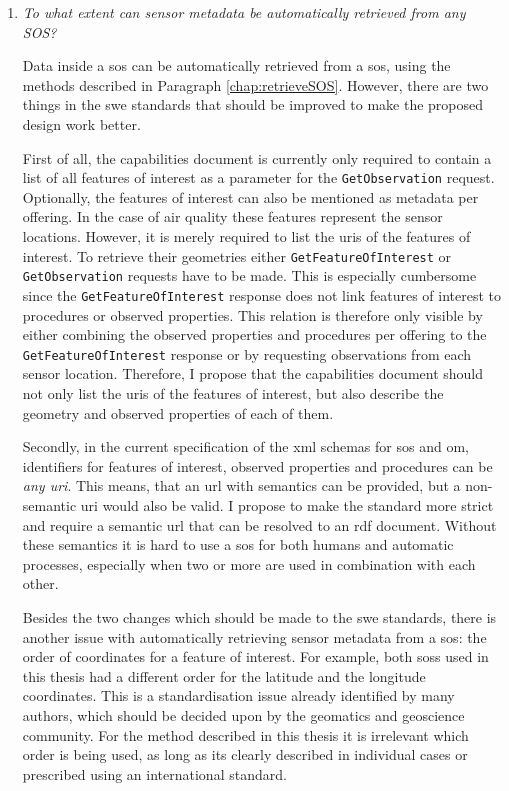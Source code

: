 \begin{enumerate}
\item \textit{To what extent can sensor metadata be automatically retrieved from any SOS?}%

Data inside a \acl{sos} can be automatically retrieved from a \ac{sos}, using the methods described in Paragraph \ref{chap:retrieveSOS}. However, there are two things in the \ac{swe} standards that should be improved to make the proposed design work better. 

\begin{sloppypar}
	First of all, the capabilities document is currently only required to contain a list of all features of interest as a parameter for the \texttt{GetObservation} request. Optionally, the features of interest can also be mentioned as metadata per offering. In the case of air quality these features represent the sensor locations. However, it is merely required to list the \acp{uri} of the features of interest. To retrieve their geometries either \texttt{GetFeatureOfInterest} or \texttt{GetObservation} requests have to be made. This is especially cumbersome since the \texttt{GetFeatureOfInterest} response does not link features of interest to procedures or observed properties. This relation is therefore only visible by either combining the observed properties and procedures per offering to the \texttt{GetFeatureOfInterest} response or by requesting observations from each sensor location. Therefore, I propose that the capabilities document should not only list the \acp{uri} of the features of interest, but also describe the geometry and observed properties of each of them. 
\end{sloppypar}

Secondly, in the current specification of the \ac{xml} schemas for \ac{sos} and \ac{om}, identifiers for features of interest, observed properties and procedures can be \textit{any \ac{uri}}. This means, that an \ac{url} with semantics can be provided, but a non-semantic \ac{uri} would also be valid. I propose to make the standard more strict and require a semantic \ac{url} that can be resolved to an \ac{rdf} document. Without these semantics it is hard to use a \ac{sos} for both humans and automatic processes, especially when two or more are used in combination with each other. 

Besides the two changes which should be made to the \ac{swe} standards, there is another issue with automatically retrieving sensor metadata from a \ac{sos}: the order of coordinates for a feature of interest. For example, both \aclp{sos} used in this thesis had a different order for the latitude and the longitude coordinates. This is a standardisation issue already identified by many authors, which should be decided upon by the geomatics and geoscience community. For the method described in this thesis it is irrelevant which order is being used, as long as its clearly described in individual cases or prescribed using an international standard.


\end{enumerate}
